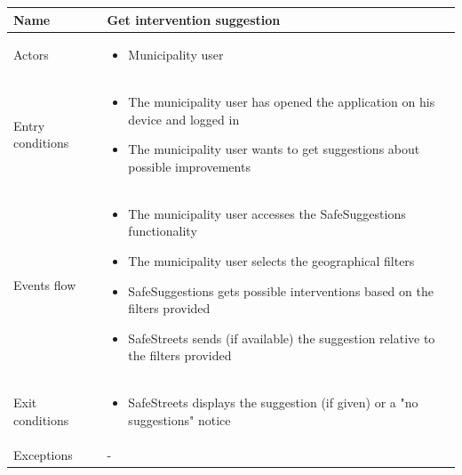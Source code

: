 \documentclass[a4paper]{article}
\begin{document}
\begin{table}[H]
\centering
\begin{tabularx}{\textwidth}{|l|X|}
\hline
Name & Get intervention suggestion\tabularnewline
\hline
Actors &
\begin{itemize}[nosep,leftmargin=*]
\item Municipality user
\end{itemize}
\tabularnewline
\hline
Entry conditions &
\begin{itemize}[nosep,leftmargin=*]
\item The municipality user has opened the application on his device and
logged in
\item The municipality user wants to get suggestions about possible
improvements
\end{itemize}
\tabularnewline
\hline
Events flow &
\begin{itemize}[nosep,leftmargin=*]
\item The municipality user accesses the SafeSuggestions functionality
\item The municipality user selects the geographical filters
\item SafeSuggestions gets possible interventions based on the filters
provided
\item SafeStreets sends (if available) the suggestion relative to the
filters provided
\end{itemize}
\tabularnewline
\hline
Exit conditions &
\begin{itemize}[nosep,leftmargin=*]
\item SafeStreets displays the suggestion (if given) or a "no suggestions"
notice
\end{itemize}
\tabularnewline
\hline
Exceptions & -\tabularnewline
\hline
\end{tabularx}
\end{table}
\end{document}

